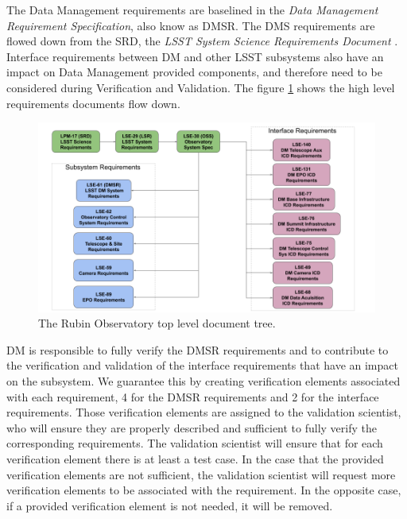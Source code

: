 The Data Management requirements are baselined in the \textit{Data Management Requirement Specification}\cite{LSE-61}, also know as DMSR.
The DMS requirements are flowed down from the SRD, the \textit{LSST System Science Requirements Document} \cite{LPM-17}. 
Interface requirements between DM and other LSST subsystems also have an impact on Data Management provided components, 
and therefore need to be considered during Verification and Validation. 
The figure \ref{fig:topdoctree} shows the high level requirements documents flow down.

\begin{figure}
\begin{center}
\includegraphics[width=\textwidth]{imgs/TopLevelDocTree.png}
 \caption{The Rubin Observatory top level document tree.}
 \label{fig:topdoctree}
\end{center}
\end{figure}

DM is responsible to fully verify the DMSR requirements and to contribute to the verification and validation of the interface requirements that have an impact on the subsystem.
We guarantee this by creating verification elements associated with each requirement, 4 for the DMSR requirements and 2 for the interface requirements.
Those verification elements are assigned to the validation scientist, 
who will ensure they are properly described and sufficient to fully verify the corresponding requirements. 
The validation scientist will ensure that for each verification element there is at least a test case.
In the case that the provided verification elements are not sufficient, the validation scientist will request more verification elements to be associated with the requirement.
In the opposite case, if a provided verification element is not needed, it will be removed.

